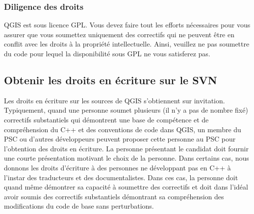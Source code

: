 \subsubsection{Diligence des droits}
QGIS est sous licence GPL. Vous devez faire tout les efforts n\'ecessaires pour vous assurer que vous soumettez uniquement des correctifs qui ne peuvent \^etre en conflit avec les droits \`a la propri\'et\'e intellectuelle. Ainsi, veuillez ne pas soumettre du code pour lequel la disponibilit\'e sous GPL ne vous satisferez pas.

\subsection{Obtenir les droits en \'ecriture sur le SVN}
Les droits en \'ecriture sur les sources de QGIS s'obtiennent sur invitation. Typiquement, quand une personne soumet plusieurs (il n'y a pas de nombre fix\'e) correctifs substantiels qui d\'emontrent une base de comp\'etence et de compr\'ehension du C++ et des conventions de code dans QGIS, un membre du PSC ou d'autres d\'eveloppeurs peuvent proposer cette personne au PSC pour l'obtention des droits en \'ecriture. La personne pr\'esentant le candidat doit fournir une courte pr\'esentation motivant le choix de la personne. Dans certains cas, nous donnons les droits d'\'ecriture \`a des personnes ne d\'eveloppant pas en C++ \`a l'instar des traducteurs et des documentalistes. Dans ces cas, la personne doit quand m\^eme d\'emontrer sa capacit\'e \`a soumettre des correctifs et doit dans l'id\'eal avoir soumis des correctifs substantiels d\'emontrant sa compr\'ehension des modifications du code de base sans perturbations.

